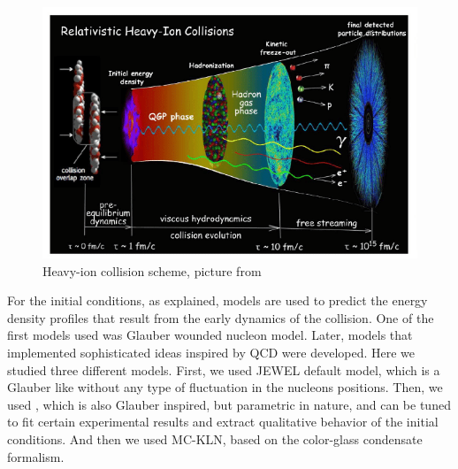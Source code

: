 \begin{figure}
\includegraphics[width=1.0\textwidth]{images/Illustration-of-the-dynamical-evolution-of-relativistic-heavy-ion-collisions-and-the-QGP.png}
\caption[Heavy-ion collision scheme]{Heavy-ion collision scheme, picture from \cite{scharenberg_hot_2018}}
\label{heavy_ion}
\end{figure}

 \label{IC}

For the initial conditions, as explained, models are used to predict the energy density profiles that result from the early dynamics of the collision. One of the first models used was Glauber wounded nucleon model\cite{miller_glauber_2007}. Later, models that implemented sophisticated ideas inspired by QCD were developed. Here we studied three different models. First, we used JEWEL\cite{zapp_monte_2009,zapp_local_2011} default model, which is a Glauber like without any type of fluctuation in the nucleons positions. Then, we used \trento\cite{moreland_alternative_2015}, which is also Glauber inspired, but parametric in nature, and can be tuned to fit certain experimental results and extract qualitative behavior of the initial conditions. And then we used MC-KLN\cite{drescher_effects_2007}, based on the color-glass condensate formalism.


